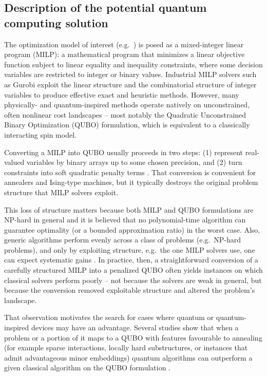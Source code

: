 \documentclass{oqireport}
\begin{document}
\subsection{Description of the potential quantum computing solution}\label{PoC}

The optimization model of interest (e.g.\ \cite{esteso_sustainable_2023}) is posed as a mixed-integer linear program (MILP): a mathematical program that minimizes a linear objective function subject to linear equality and inequality constraints, where some decision variables are restricted to integer or binary values. Industrial MILP solvers such as Gurobi exploit the linear structure and the combinatorial structure of integer variables to produce effective exact and heuristic methods. However, many physically- and quantum-inspired methods operate natively on unconstrained, often nonlinear cost landscapes -- most notably the Quadratic Unconstrained Binary Optimization (QUBO) formulation, which is equivalent to a classically interacting spin model.

Converting a MILP into QUBO usually proceeds in two steps: (1) represent real-valued variables by binary arrays up to some chosen precision, and (2) turn constraints into soft quadratic penalty terms \cite{wang_quantum-inspired_2022}. That conversion is convenient for annealers and Ising-type machines, but it typically destroys the original problem structure that MILP solvers exploit.

This loss of structure matters because both MILP and QUBO formulations are NP-hard in general \cite{FBarahona_1982} and it is believed that no polynomial-time algorithm can guarantee optimality (or a bounded approximation ratio) in the worst case. Also, generic algorithms perform evenly across a class of problems (e.g.\ NP-hard problems), and only by exploiting structure, e.g.\ the one MILP solvers use, one can expect systematic gains \cite{NFL,ronnow2014defining}. In practice, then, a straightforward conversion of a carefully structured MILP into a penalized QUBO often yields instances on which classical solvers perform poorly -- not because the solvers are weak in general, but because the conversion removed exploitable structure and altered the problem’s landscape.

That observation motivates the search for cases where quantum or quantum-inspired devices may have an advantage. Several studies show that when a problem or a portion of it maps to a QUBO with features favourable to annealing (for example sparse interactions, locally hard substructures, or instances that admit advantageous minor embeddings) quantum algorithms can outperform a given classical algorithm on the QUBO formulation \cite{ajagekar_quantum_2019,ajagekar_quantum_2020,abbas_quantum_2023}.
\end{document}
